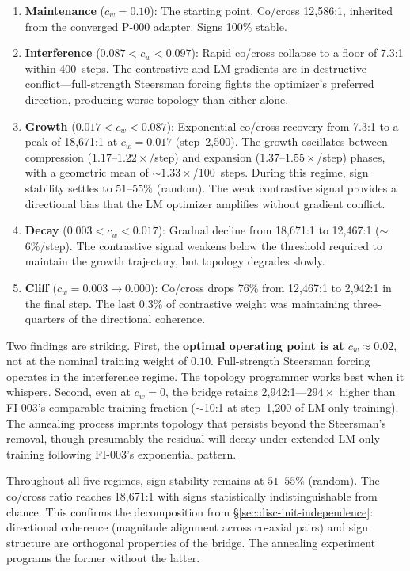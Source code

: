 \begin{enumerate}
\item \textbf{Maintenance} ($c_w = 0.10$): The starting point. Co/cross
  12{,}586:1, inherited from the converged P-000 adapter. Signs 100\%
  stable.
\item \textbf{Interference} ($0.087 < c_w < 0.097$): Rapid co/cross
  collapse to a floor of 7.3:1 within 400~steps. The contrastive and
  LM gradients are in destructive conflict---full-strength Steersman
  forcing fights the optimizer's preferred direction, producing worse
  topology than either alone.
\item \textbf{Growth} ($0.017 < c_w < 0.087$): Exponential co/cross
  recovery from 7.3:1 to a peak of 18{,}671:1 at $c_w = 0.017$
  (step~2{,}500). The growth oscillates between compression
  ($1.17$--$1.22\times$/step) and expansion ($1.37$--$1.55\times$/step)
  phases, with a geometric mean of $\sim$$1.33\times$/100~steps. During this
  regime, sign stability settles to $51$--$55\%$ (random). The weak
  contrastive signal provides a directional bias that the LM optimizer
  amplifies without gradient conflict.
\item \textbf{Decay} ($0.003 < c_w < 0.017$): Gradual decline from
  18{,}671:1 to 12{,}467:1 ($\sim$6\%/step). The contrastive signal
  weakens below the threshold required to maintain the growth trajectory,
  but topology degrades slowly.
\item \textbf{Cliff} ($c_w = 0.003 \to 0.000$): Co/cross drops 76\%
  from 12{,}467:1 to 2{,}942:1 in the final step. The last 0.3\% of
  contrastive weight was maintaining three-quarters of the directional
  coherence.
\end{enumerate}

Two findings are striking. First, the \textbf{optimal operating point
is at $c_w \approx 0.02$}, not at the nominal training weight of $0.10$.
Full-strength Steersman forcing operates in the interference regime.
The topology programmer works best when it whispers. Second, even at
$c_w = 0$, the bridge retains 2{,}942:1---$294\times$ higher than
FI-003's comparable training fraction ($\sim$10:1 at step~1{,}200 of
LM-only training). The annealing process imprints topology that persists
beyond the Steersman's removal, though presumably the residual will decay
under extended LM-only training following FI-003's exponential pattern.

Throughout all five regimes, sign stability remains at $51$--$55\%$
(random). The co/cross ratio reaches 18{,}671:1 with signs statistically
indistinguishable from chance. This confirms the decomposition from
\S\ref{sec:disc-init-independence}: directional coherence (magnitude
alignment across co-axial pairs) and sign structure are orthogonal
properties of the bridge. The annealing experiment programs the former
without the latter.

